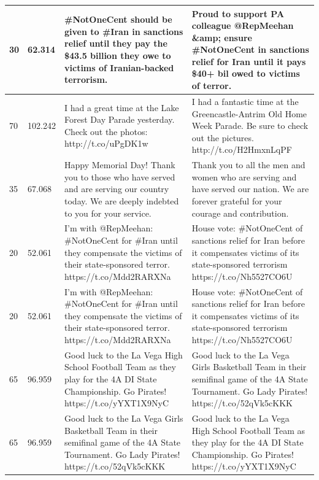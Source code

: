 \begin{table}[]
\begin{tabular}{|p{}|p{}|p{}|p{}|}
30       & 62.314                      & \#NotOneCent should be given to \#Iran in sanctions relief until they pay the \$43.5 billion they owe to victims of Iranian-backed terrorism.           & Proud to support PA colleague @RepMeehan \&amp; ensure \#NotOneCent in sanctions relief for Iran until it pays \$40+ bil owed to victims of terror. \\ \hline
70       & 102.242                     & I had a great time at the Lake Forest Day Parade yesterday. Check out the photos: http://t.co/uPgDK1w                                                   & I had a fantastic time at the Greencastle-Antrim Old Home Week Parade. Be sure to check out the pictures. http://t.co/H2HmxnLqPF                    \\ \hline
35       & 67.068                      & Happy Memorial Day! Thank you to those who have served and are serving our country today.  We are deeply indebted to you for your service.              & Thank you to all the men and women who are serving and have served our nation. We are forever grateful for your courage and contribution.           \\ \hline
20       & 52.061                      & I'm with @RepMeehan: \#NotOneCent for \#Iran until they compensate the victims of their state-sponsored terror. https://t.co/Mdd2RARXNa                 & House vote: \#NotOneCent of sanctions relief for Iran before it compensates victims of its state-sponsored terrorism https://t.co/Nh5527CO6U        \\ \hline
20       & 52.061                      & I'm with @RepMeehan: \#NotOneCent for \#Iran until they compensate the victims of their state-sponsored terror. https://t.co/Mdd2RARXNa                 & House vote: \#NotOneCent of sanctions relief for Iran before it compensates victims of its state-sponsored terrorism https://t.co/Nh5527CO6U        \\ \hline
65       & 96.959                      & Good luck to the La Vega High School Football Team as they play for the 4A DI State Championship. Go Pirates! https://t.co/yYXT1X9NyC                   & Good luck to the La Vega Girls Basketball Team in their semifinal game of the 4A State Tournament. Go Lady Pirates! https://t.co/52qVk5cKKK         \\ \hline
65       & 96.959                      & Good luck to the La Vega Girls Basketball Team in their semifinal game of the 4A State Tournament. Go Lady Pirates! https://t.co/52qVk5cKKK             & Good luck to the La Vega High School Football Team as they play for the 4A DI State Championship. Go Pirates! https://t.co/yYXT1X9NyC               \\ \hline

\end{tabular}
\end{table}
